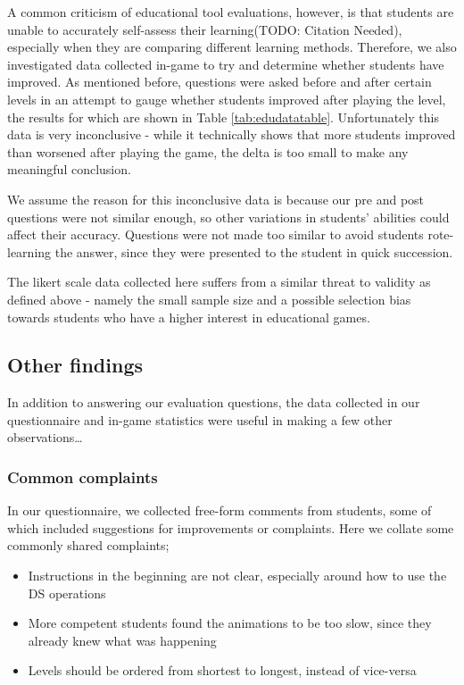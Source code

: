 \documentclass[10pt]{article}
\begin{document}
A common criticism of educational tool evaluations, however, is that students are unable to accurately self-assess their learning(TODO: Citation Needed), especially when they are comparing different learning methods. Therefore, we also investigated data collected in-game to try and determine whether students have improved. As mentioned before, questions were asked before and after certain levels in an attempt to gauge whether students improved after playing the level, the results for which are shown in Table \ref{tab:edudatatable}. Unfortunately this data is very inconclusive - while it technically shows that more students improved than worsened after playing the game, the delta is too small to make any meaningful conclusion.\par
We assume the reason for this inconclusive data is because our pre and post questions were not similar enough, so other variations in students' abilities could affect their accuracy. Questions were not made too similar to avoid students rote-learning the answer, since they were presented to the student in quick succession.\par
The likert scale data collected here suffers from a similar threat to validity as defined above - namely the small sample size and a possible selection bias towards students who have a higher interest in educational games.
\subsection{Other findings}
In addition to answering our evaluation questions, the data collected in our questionnaire and in-game statistics were useful in making a few other observations\dots
\subsubsection{Common complaints}
In our questionnaire, we collected free-form comments from students, some of which included suggestions for improvements or complaints. Here we collate some commonly shared complaints;
\begin{itemize}
  \item Instructions in the beginning are not clear, especially around how to use the DS operations
  \item More competent students found the animations to be too slow, since they already knew what was happening
  \item Levels should be ordered from shortest to longest, instead of vice-versa
\end{itemize}
\end{document}
